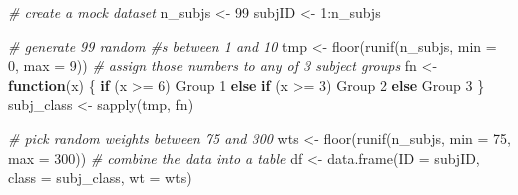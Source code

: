 \documentclass[smallextended]{svjour3}       %
\newenvironment{Shaded}{\begin{snugshade}}{\end{snugshade}}
\newcommand{\AttributeTok}[1]{\textcolor[rgb]{0.77,0.63,0.00}{#1}}
\newcommand{\CommentTok}[1]{\textcolor[rgb]{0.56,0.35,0.01}{\textit{#1}}}
\newcommand{\ControlFlowTok}[1]{\textcolor[rgb]{0.13,0.29,0.53}{\textbf{#1}}}
\newcommand{\DecValTok}[1]{\textcolor[rgb]{0.00,0.00,0.81}{#1}}
\newcommand{\FunctionTok}[1]{\textcolor[rgb]{0.00,0.00,0.00}{#1}}
\newcommand{\NormalTok}[1]{#1}
\newcommand{\OtherTok}[1]{\textcolor[rgb]{0.56,0.35,0.01}{#1}}
\newcommand{\SpecialCharTok}[1]{\textcolor[rgb]{0.00,0.00,0.00}{#1}}
\newcommand{\StringTok}[1]{\textcolor[rgb]{0.31,0.60,0.02}{#1}}
\begin{document}
\begin{Shaded}
\begin{Highlighting}[]
\CommentTok{\# create a mock dataset}
\NormalTok{n\_subjs }\OtherTok{\textless{}{-}} \DecValTok{99}
\NormalTok{subjID }\OtherTok{\textless{}{-}} \DecValTok{1}\SpecialCharTok{:}\NormalTok{n\_subjs}

\CommentTok{\# generate 99 random \#s between 1 and 10}
\NormalTok{tmp }\OtherTok{\textless{}{-}} \FunctionTok{floor}\NormalTok{(}\FunctionTok{runif}\NormalTok{(n\_subjs, }\AttributeTok{min =} \DecValTok{0}\NormalTok{, }\AttributeTok{max =} \DecValTok{9}\NormalTok{))}
\CommentTok{\# assign those numbers to any of 3 subject groups}
\NormalTok{fn }\OtherTok{\textless{}{-}} \ControlFlowTok{function}\NormalTok{(x) \{ }
  \ControlFlowTok{if}\NormalTok{ (x }\SpecialCharTok{\textgreater{}=} \DecValTok{6}\NormalTok{) }\StringTok{\textquotesingle{}Group 1\textquotesingle{}} 
  \ControlFlowTok{else} \ControlFlowTok{if}\NormalTok{ (x }\SpecialCharTok{\textgreater{}=} \DecValTok{3}\NormalTok{) }\StringTok{\textquotesingle{}Group 2\textquotesingle{}} 
  \ControlFlowTok{else} \StringTok{\textquotesingle{}Group 3\textquotesingle{}} 
\NormalTok{\}}
\NormalTok{subj\_class }\OtherTok{\textless{}{-}} \FunctionTok{sapply}\NormalTok{(tmp, fn)}

\CommentTok{\# pick random weights between 75 and 300}
\NormalTok{wts }\OtherTok{\textless{}{-}} \FunctionTok{floor}\NormalTok{(}\FunctionTok{runif}\NormalTok{(n\_subjs, }\AttributeTok{min =} \DecValTok{75}\NormalTok{, }\AttributeTok{max =} \DecValTok{300}\NormalTok{))}
\CommentTok{\# combine the data into a table}
\NormalTok{df }\OtherTok{\textless{}{-}} \FunctionTok{data.frame}\NormalTok{(}\AttributeTok{ID =}\NormalTok{ subjID, }\AttributeTok{class =}\NormalTok{ subj\_class, }\AttributeTok{wt =}\NormalTok{ wts)}


\end{Highlighting}
\end{Shaded}
\end{document}
